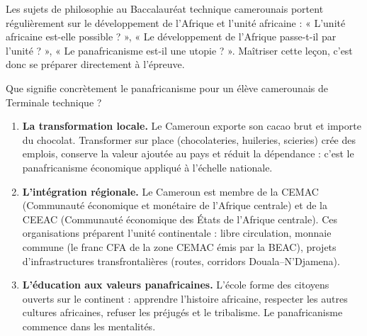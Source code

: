 \documentclass[11pt]{article}
\newcommand{\cle}[1]{{\popxbold\color{popdark}#1}}
\newcounter{popsec}
\newcounter{popsub}
\newcommand{\courssub}[1]{%
  \stepcounter{popsub}%
  \par\vspace{9pt}\noindent{\popxbold\fontsize{11.5}{13}\selectfont\color{popink}{\color{poporange}\thepopsec.\thepopsub}\hspace{6pt}#1}\par\nopagebreak\vspace{4pt}
}
\begin{document}
\begin{savaistu}[Le savais-tu ?]
Les sujets de philosophie au Baccalauréat technique camerounais portent régulièrement sur le développement de l'Afrique et l'unité africaine : « L'unité africaine est-elle possible ? », « Le développement de l'Afrique passe-t-il par l'unité ? », « Le panafricanisme est-il une utopie ? ». Maîtriser cette leçon, c'est donc se préparer directement à l'épreuve.
\end{savaistu}

\courssub{Application au Cameroun}

Que signifie concrètement le panafricanisme pour un élève camerounais de Terminale technique ?

\begin{enumerate}
\item \textbf{La transformation locale.} Le Cameroun exporte son cacao brut et importe du chocolat. Transformer sur place (chocolateries, huileries, scieries) crée des emplois, conserve la valeur ajoutée au pays et réduit la dépendance : c'est le panafricanisme économique appliqué à l'échelle nationale.
\item \textbf{L'intégration régionale.} Le Cameroun est membre de la \cle{CEMAC} (Communauté économique et monétaire de l'Afrique centrale) et de la \cle{CEEAC} (Communauté économique des États de l'Afrique centrale). Ces organisations préparent l'unité continentale : libre circulation, monnaie commune (le franc CFA de la zone CEMAC émis par la BEAC), projets d'infrastructures transfrontalières (routes, corridors Douala--N'Djamena).
\item \textbf{L'éducation aux valeurs panafricaines.} L'école forme des citoyens ouverts sur le continent : apprendre l'histoire africaine, respecter les autres cultures africaines, refuser les préjugés et le tribalisme. Le panafricanisme commence dans les mentalités.
\end{enumerate}
\end{document}
